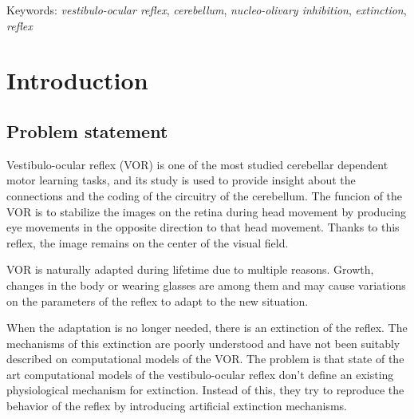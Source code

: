 \documentclass[12pt, a4paper,twoside]{tesi_upf}
\newcommand{\keyword}[1]{\textit{#1}}
\begin{document}
\vskip 1cm

Keywords: \keyword{vestibulo-ocular reflex}, \keyword{cerebellum}, \keyword{nucleo-olivary inhibition}, \keyword{extinction}, \keyword{reflex}

\vspace*{\fill}

\cleardoublepage

\cleardoublepage

\tableofcontents

\listoffigures


\mainmatter
\chapter{Introduction}

\section{Problem statement}

Vestibulo-ocular reflex (VOR) is one of the most studied cerebellar dependent motor learning tasks, and its study is used to provide insight about the connections and the coding of the circuitry of the cerebellum. The funcion of the VOR is to stabilize the images on the retina during head movement by producing eye movements in the opposite direction to that head movement. Thanks to this reflex, the image remains on the center of the visual field.

VOR is naturally adapted during lifetime due to multiple reasons. Growth, changes in the body or wearing glasses are among them and may cause variations on the parameters of the reflex to adapt to the new situation.

When the adaptation is no longer needed, there is an extinction of the reflex. The mechanisms of this extinction are poorly understood and have not been suitably described on computational models of the VOR. The problem is that state of the art computational models of the vestibulo-ocular reflex don't define an existing physiological mechanism for extinction. Instead of this, they try to reproduce the behavior of the reflex by introducing artificial extinction mechanisms.
\end{document}

